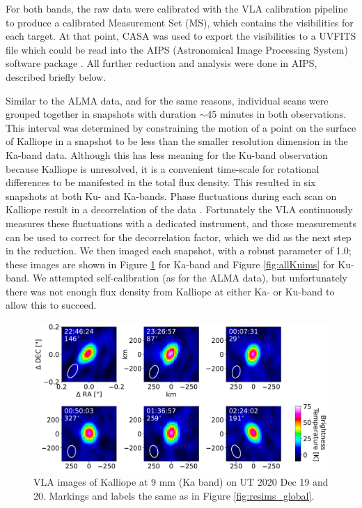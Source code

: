 \documentclass[]{aastex631}
\begin{document}
For both bands, the raw data were calibrated with the VLA calibration pipeline \citep{kent2019} to produce a calibrated Measurement Set (MS), which contains the visibilities for each target.  At that point, CASA was used to export the visibilities to a UVFITS file which could be read into the AIPS (Astronomical Image Processing System) software package \citep{greisen2003}.  All further reduction and analysis were done in AIPS, described briefly below.

Similar to the ALMA data, and for the same reasons, individual scans were grouped together in snapshots with duration $\sim$45 minutes in both observations.  This interval was determined by constraining the motion of a point on the surface of Kalliope in a snapshot to be less than the smaller resolution dimension in the Ka-band data.  Although this has less meaning for the Ku-band observation because Kalliope is unresolved, it is a convenient time-scale for rotational differences to be manifested in the total flux density.  This resulted in six snapshots at both Ku- and Ka-bands.  Phase fluctuations during each scan on Kalliope result in a decorrelation of the data \citep{carilli1999}.  Fortunately the VLA continuously measures these fluctuations with a dedicated instrument, and those measurements can be used to correct for the decorrelation factor, which we did as the next step in the reduction.  We then imaged each snapshot, with a robust parameter of 1.0; these images are shown in Figure \ref{fig:allKaims} for Ka-band and Figure \ref{fig:allKuims} for Ku-band.  We attempted self-calibration (as for the ALMA data), but unfortunately there was not enough flux density from Kalliope at either Ka- or Ku-band to allow this to succeed.

\begin{figure}[ht!]
\centering
\includegraphics[width=14cm]{Kalliope_KaImages_Mar2024.pdf}
\caption{VLA images of Kalliope at 9 mm (Ka band) on UT 2020 Dec 19 and 20. Markings and labels the same as in Figure \ref{fig:resims_global}.\label{fig:allKaims}}
\end{figure}
\end{document}
